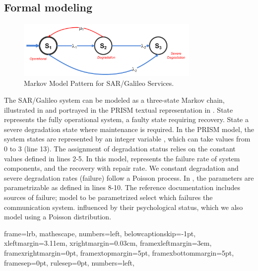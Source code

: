 \subsection{Formal modeling}

\begin{figure}[htbp]
     \centering
     		\includegraphics[width=250pt, height =80pt]{automat.pdf}
     \caption{Markov Model Pattern for SAR/Galileo Services.}
     \label{fig:model}
 \end{figure} 
 
The SAR/Galileo system can be modeled as a three-state Markov chain, illustrated in  and portrayed in the PRISM textual representation in . State   represents the fully operational system,    a faulty state requiring recovery. State   a severe degradation state where maintenance is required. In the PRISM model, the system states are represented by an integer variable , which can take values from 0 to 3 (line 13). The assignment of degradation status relies on the constant values defined in lines 2-5. In this model, \emath{\lambda} represents the failure rate of system components, and   the recovery with repair rate. We  constant degradation and severe degradation rates (failure) follow a Poisson process. In , the parameters are parametrizable as defined in lines 8-10. The reference documentation includes  sources of failure;  model to be parametrized  select which failures  the communication system.  influenced by their psychological status, which we also model using a Poisson distribution. 



{
	frame=lrb,
	mathescape,
	numbers=left,
	belowcaptionskip=-1pt,
	xleftmargin=3.11em,
	xrightmargin=0.03cm,
	framexleftmargin=3em,
	framexrightmargin=0pt,
	framextopmargin=5pt,
	framexbottommargin=5pt,
	framesep=0pt,
	rulesep=0pt,
	numbers=left,
}

